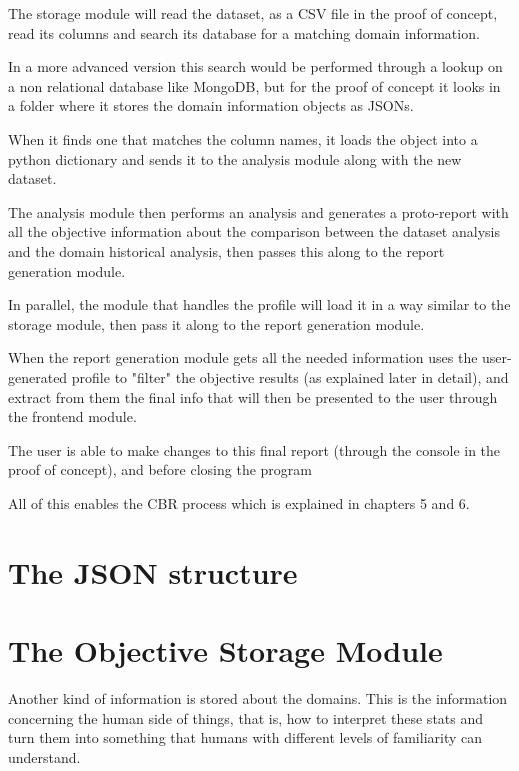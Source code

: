 The storage module will read the dataset, as a CSV file in the proof of concept, read its columns and search its database for a matching domain information.

In a more advanced version this search would be performed through a lookup on a non relational database like MongoDB, but for the proof of concept it looks in a folder where it stores the domain information objects as JSONs.

When it finds one that matches the column names, it loads the object into a python dictionary and sends it to the analysis module along with the new dataset.

The analysis module then performs an analysis and generates a proto-report with all the objective information about the comparison between the dataset analysis and the domain historical analysis, then passes this along to the report generation module.

In parallel, the module that handles the profile will load it in a way similar to the storage module, then pass it along to the report generation module.

When the report generation module gets all the needed information uses the user-generated profile to "filter" the objective results (as explained later in detail), and extract from them the final info that will then be presented to the user through the frontend module.

The user is able to make changes to this final report (through the console in the proof of concept), and before closing the program

All of this enables the CBR process which is explained in chapters 5 and 6.

\section{The JSON structure}
\label{cap2:sec:jsonfiller}

\section{The Objective Storage Module}
\label{cap2:sec:profilejson}

Another kind of information is stored about the domains. This is the information concerning the human side of things, that is, how to interpret these stats and turn them into something that humans with different levels of familiarity can understand.

